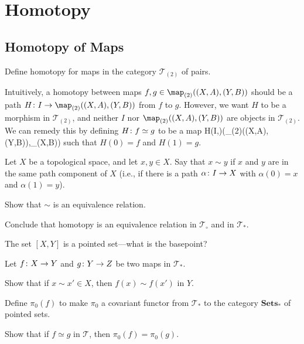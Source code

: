 \chapter{Homotopy}

\section{Homotopy of Maps}

\bx
Define homotopy for maps in the category $\mathcal{T}_{(2)}$ of pairs.
\ex

\bs
Intuitively, a homotopy between maps $f,g\in\map_{(2)}((X,A),(Y,B))$ should be a path $H\cl I\to\map_{(2)}((X,A),(Y,B))$ from $f$ to $g$. However, we want $H$ to be a morphism in $\mathcal{T}_{(2)}$, and neither $I$ nor $\map_{(2)}((X,A),(Y,B))$ are objects in $\mathcal{T}_{(2)}$. We can remedy this by defining $H\colon f\simeq g$ to be a map
\bse
H\cl (I,\vn)\longrightarrow (\map_{(2)}((X,A),(Y,B)),\map_{\circ}(X,B))
\ese
such that $H(0)=f$ and $H(1)=g$.
\es

\bp
Let $X$ be a topological space, and let $x, y \in X$. Say that $x \sim y$ if $x$ and $y$ are in the same path component of $X$ (i.e., if there is a path $\alpha \colon I \to X$ with $\alpha(0) = x$ and $\alpha(1) = y$).
\ben[label=(\alph*)]
\item Show that $\sim$ is an equivalence relation.
\item Conclude that homotopy is an equivalence relation in $\mathcal{T}_{\circ}$ and in $\mathcal{T}_*$.
\een
\ep

\bs
\ben[label=(\alph*)]
\item 
\item 
\een
\es

\bx
The set $[X, Y ]$ is a pointed set---what is the basepoint?
\ex

\bs
\es

\bp
Let $f \colon X \to Y$ and $g \colon Y \to Z$ be two maps in $\mathcal{T}_*$.
\ben[label=(\alph*)]
\item Show that if $x \sim x' \in X$, then $f(x) \sim f(x')$ in $Y$.
\item Define $\pi_0(f)$ to make $\pi_0$ a covariant functor from $\mathcal{T}_*$ to the category $\mathbf{Sets}_*$ of pointed sets.
\item Show that if $f \simeq g$ in $\mathcal{T}$, then $\pi_0(f) = \pi_0(g)$.
\een
\ep

\bs
\ben[label=(\alph*)]
\item 
\item 
\item 
\een
\es

